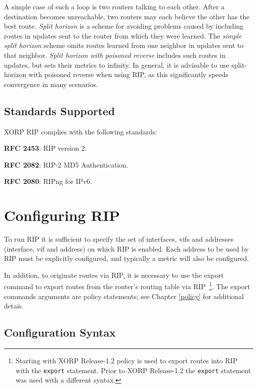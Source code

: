 A simple case of such a loop is two routers talking to each other.
After a destination becomes unreachable, two routers may each believe
the other has the best route.  {\it Split horizon} is a scheme for
avoiding problems caused by including routes in updates sent to the
router from which they were learned.  The {\it simple split horizon}
scheme omits routes learned from one neighbor in updates sent to that
neighbor.  {\it Split horizon with poisoned reverse} includes such
routes in updates, but sets their metrics to infinity.  In general, it
is advisable to use split-horizon with poisoned reverse when using
RIP, as this significantly speeds convergence in many scenarios.

\subsection{Standards Supported}

XORP RIP complies with the following standards:
\begin{description}
\item{\bf RFC 2453}: RIP version 2.
\item{\bf RFC 2082}: RIP-2 MD5 Authentication.
\item{\bf RFC 2080}: RIPng for IPv6.
\end{description} 

\newpage
\section{Configuring RIP}

To run RIP it is sufficient to specify the set of interfaces, vifs and
addresses ({\stt interface}, {\stt vif} and {\stt address}) on which
RIP is enabled.  Each {\stt address} to be used by RIP must be
explicitly configured, and typically a metric will also be configured.

In addition, to originate routes via RIP, it is necessary to use the
{\stt export} command to export routes from the router's routing table
via RIP~\footnote{Starting with XORP Release-1.2 policy is used to
export routes into RIP with the {\tt export} statement.  Prior to XORP
Release-1.2 the {\tt export} statement was used with a different syntax.}.
The {\stt export} commands arguments are policy statements;
see Chapter \ref{policy} for additional detais.

\subsection{Configuration Syntax}


